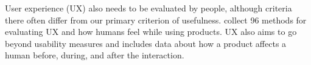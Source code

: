 User experience (UX) also needs to be evaluated by people, although
criteria there often differ from our primary criterion of
usefulness.  collect 96
methods for evaluating UX and how humans feel while using products.
UX also aims to go beyond usability measures and includes data about
how a product affects a human before, during, and after the interaction.
